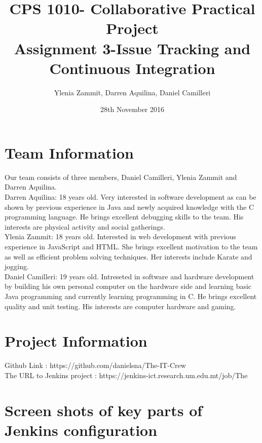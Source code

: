 \documentclass[UTF8]{article}
\begin{document}
\title{%
  CPS 1010- Collaborative Practical Project\\  
  \vspace{5mm}  
  \large Assignment 3-Issue Tracking and Continuous Integration}
\vspace{100mm}
\author{Ylenia Zammit, Darren Aquilina, Daniel Camilleri}
\date{28th November 2016} 
\maketitle

\newpage
\section{Team Information}
Our team consists of three members, Daniel Camilleri, Ylenia Zammit and Darren Aquilina.
\vspace{5mm}
\\
Darren Aquilina:
	18 years old. Very interested in software development as can be shown by previous experience in Java and newly acquired knowledge with the C programming language. 
	He brings excellent debugging skills to the team. His interests are physical activity and social gatherings.
\vspace{5mm}
\\
Ylenia Zammit:
	18 years old. Interested in web development with previous experience in JavaScript and HTML.
	She brings excellent motivation to the team as well as efficient problem solving techniques.
	Her interests include Karate and jogging.
\vspace{5mm}
\\
Daniel Camilleri: 19 years old. Intreseted in software and hardware development by building his own personal computer on the hardware side and learning basic Java programming and currently learning programming in C.
		  He brings excellent quality and unit testing. His interests are computer hardware and gaming.
\newpage
\section{Project Information}
Github Link : https://github.com/danielsna/The-IT-Crew
\vspace{5mm}
\\
The URL to Jenkins project : https://jenkins-ict.research.um.edu.mt/job/The%
\newpage
\section{Screen shots of key parts of Jenkins configuration}
\end{document}
